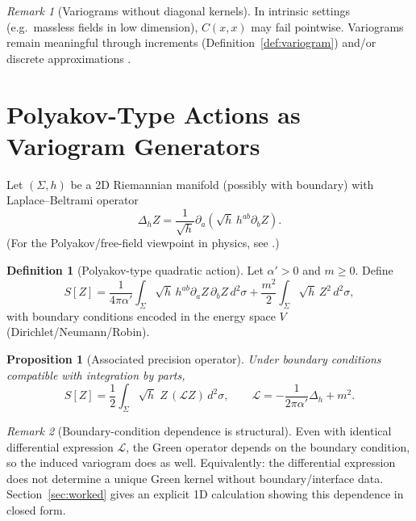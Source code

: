 \documentclass[11pt]{article}
\theoremstyle{definition}
\newtheorem{definition}{Definition}[section]
\theoremstyle{plain}
\newtheorem{proposition}{Proposition}[section]
\theoremstyle{remark}
\newtheorem{remark}{Remark}[section]
\begin{document}
\begin{remark}[Variograms without diagonal kernels]
In intrinsic settings (e.g.\ massless fields in low dimension), $C(x,x)$ may fail pointwise.
Variograms remain meaningful through increments (Definition~\ref{def:variogram}) and/or discrete approximations
\citep{Matheron1971,Cardy1996}.
\end{remark}

\section{Polyakov-Type Actions as Variogram Generators}\label{sec:polyakov}

Let $(\Sigma,h)$ be a 2D Riemannian manifold (possibly with boundary) with Laplace--Beltrami operator
\[
\Delta_h Z=\frac{1}{\sqrt{h}}\partial_a\!\left(\sqrt{h}\,h^{ab}\partial_b Z\right).
\]
(For the Polyakov/free-field viewpoint in physics, see \citep{Polyakov1987,Polchinski1998,DiFrancescoMathieuSenechal1997}.)

\begin{definition}[Polyakov-type quadratic action]\label{def:polyakov}
Let $\alpha'>0$ and $m\ge 0$.
Define
\[
S[Z]
=\frac{1}{4\pi\alpha'}\int_\Sigma \sqrt{h}\,h^{ab}\partial_a Z\,\partial_b Z\,d^2\sigma
+\frac{m^2}{2}\int_\Sigma \sqrt{h}\,Z^2\,d^2\sigma,
\]
with boundary conditions encoded in the energy space $V$ (Dirichlet/Neumann/Robin).
\end{definition}

\begin{proposition}[Associated precision operator]\label{prop:polyop}
Under boundary conditions compatible with integration by parts,
\[
S[Z]=\frac12\int_\Sigma \sqrt{h}\; Z\,(\mathcal{L}Z)\,d^2\sigma,
\qquad
\mathcal{L}=-\frac{1}{2\pi\alpha'}\Delta_h+m^2.
\]
\end{proposition}

\begin{remark}[Boundary-condition dependence is structural]
Even with identical differential expression $\mathcal{L}$, the Green operator depends on the boundary condition,
so the induced variogram does as well. Equivalently: the differential expression does not determine a unique
Green kernel without boundary/interface data.
Section~\ref{sec:worked} gives an explicit 1D calculation showing this dependence in closed form.
\end{remark}

\end{document}
